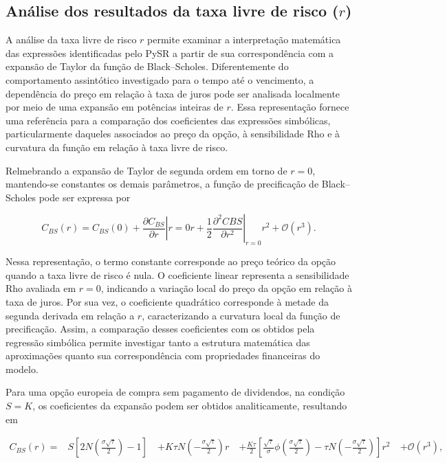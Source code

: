 \subsection{Análise dos resultados da taxa livre de risco ($r$)}

A análise da taxa livre de risco $r$ permite examinar a interpretação matemática das expressões identificadas pelo PySR a partir de sua correspondência com a expansão de Taylor da função de Black--Scholes. Diferentemente do comportamento assintótico investigado para o tempo até o vencimento, a dependência do preço em relação à taxa de juros pode ser analisada localmente por meio de uma expansão em potências inteiras de $r$. Essa representação fornece uma referência para a comparação dos coeficientes das expressões simbólicas, particularmente daqueles associados ao preço da opção, à sensibilidade Rho e à curvatura da função em relação à taxa livre de risco.

Relmebrando a expansão de Taylor de segunda ordem em torno de $r=0$, mantendo-se constantes os demais parâmetros, a função de precificação de Black--Scholes pode ser expressa por

\begin{equation}
\label{eq}
C_{BS}(r)=C_{BS}(0)
+\left.\frac{\partial C_{BS}}{\partial r}\right|{r=0}r
+\frac{1}{2}
\left.\frac{\partial^2 C{BS}}{\partial r^2}\right|_{r=0}r^2
+\mathcal{O}(r^3).
\end{equation}

Nessa representação, o termo constante corresponde ao preço teórico da opção quando a taxa livre de risco é nula. O coeficiente linear representa a sensibilidade Rho avaliada em $r=0$, indicando a variação local do preço da opção em relação à taxa de juros. Por sua vez, o coeficiente quadrático corresponde à metade da segunda derivada em relação a $r$, caracterizando a curvatura local da função de precificação. Assim, a comparação desses coeficientes com os obtidos pela regressão simbólica permite investigar tanto a estrutura matemática das aproximações quanto sua correspondência com propriedades financeiras do modelo.

Para uma opção europeia de compra sem pagamento de dividendos, na condição $S=K$, os coeficientes da expansão podem ser obtidos analiticamente, resultando em

\begin{equation}
\label{eq}
\begin{aligned}
C_{BS}(r) ={}&
S\left[2N\left(\frac{\sigma\sqrt{\tau}}{2}\right)-1\right]\
&+K\tau N\left(-\frac{\sigma\sqrt{\tau}}{2}\right)r\
&+\frac{K\tau}{2}
\left[
\frac{\sqrt{\tau}}{\sigma}
\phi\left(\frac{\sigma\sqrt{\tau}}{2}\right)
-\tau N\left(-\frac{\sigma\sqrt{\tau}}{2}\right)
\right]r^2\
&+\mathcal{O}(r^3),
\end{aligned}
\end{equation}

